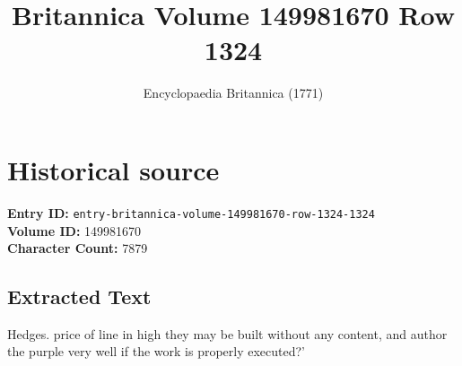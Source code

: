 \documentclass{article}
\title{Britannica Volume 149981670 Row 1324}
\date{Encyclopaedia Britannica (1771)}
\begin{document}
\maketitle

\section*{Historical source}
\textbf{Entry ID:} \texttt{entry-britannica-volume-149981670-row-1324-1324} \\
\textbf{Volume ID:} 149981670 \\
\textbf{Character Count:} 7879

\subsection*{Extracted Text}
Hedges. price of line in high they may be built without any content, and author the purple very well if the work is properly executed?’
\end{document}
